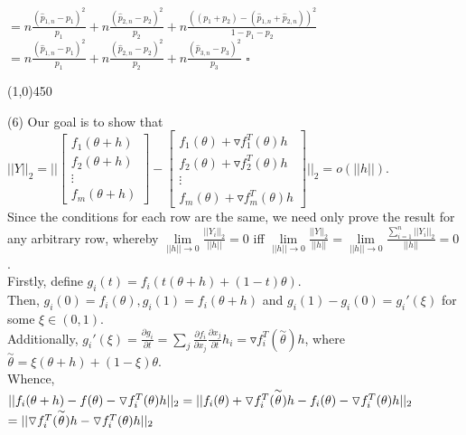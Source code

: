 \documentclass[12pt]{article}
\begin{document}
\indent\indent
$= n\frac{(\hat{p}_{1,n}-p_1)^2}{p_1}
+n\frac{(\hat{p}_{2,n}-p_2)^2}{p_2}
+n\frac{((p_1+p_2)-(\hat{p}_{1,n}+\hat{p}_{2,n}))^2}{1-p_1-p_2}$\\

\indent\indent
$= n\frac{(\hat{p}_{1,n}-p_1)^2}{p_1}
+n\frac{(\hat{p}_{2,n}-p_2)^2}{p_2}
+n\frac{(\hat{p}_{3,n}-p_3)^2}{p_3}$ $\square$

\begin{center}
\line(1,0){450}
\end{center}

\pagebreak

\noindent
(6) Our goal is to show that $||Y||_2 = ||  \left[ \begin{array}{c} f_1(\theta+h)\\ f_2(\theta+h) \\ \vdots \\ f_m(\theta+h) \end{array} \right]
- \left[ \begin{array}{c} f_1(\theta)+\triangledown f_1^T(\theta)h \\ 
f_2(\theta)+\triangledown f_2^T(\theta)h  \\ \vdots \\ 
f_m(\theta)+\triangledown f_m^T(\theta)h \end{array} \right] ||_2 = o(||h||).$\\

\noindent
Since the conditions for each row are the same, we need only prove the result for any arbitrary row, whereby $\lim\limits_{||h||\to 0} \frac{||Y_i||_2}{||h||} = 0$ iff $\lim\limits_{||h|| \to 0} \frac{||Y||_2}{||h||} = \lim\limits_{||h||\to 0} \frac{\sum_{i=1}^n ||Y_i||_2}{||h||} = 0$.\\

\noindent
Firstly, define $g_i(t) = f_i(t(\theta+h)+(1-t)\theta)$.\\
Then, $g_i(0)=f_i(\theta), g_i(1)=f_i(\theta+h)$ and $g_i(1)-g_i(0)=g_i'(\xi)$ for some $\xi \in (0,1)$.\\
Additionally, $g_i'(\xi) = \frac{\partial g_i}{\partial t} = \sum_j \frac{\partial f_i}{\partial x_j}\frac{\partial x_j}{\partial t} h_i = \triangledown f_i^T(\overset{\sim}\theta)h$, where $\overset{\sim}\theta = \xi(\theta+h)+(1-\xi)\theta$.\\

\noindent
Whence, $||f_i(\theta+h)-f(\theta)-\triangledown f_i^T(\theta)h||_2 
= ||f_i(\theta)+\triangledown f_i^T(\overset{\sim}\theta)h-f_i(\theta)-\triangledown f_i^T(\theta)h||_2$\\
\indent $= ||\triangledown f_i^T(\overset{\sim}\theta)h-\triangledown f_i^T(\theta)h||_2$\\
\end{document}
